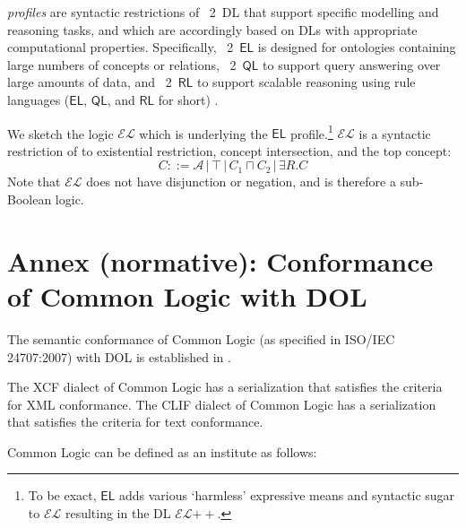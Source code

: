 \documentclass[10pt,%
\ifpretendfinal
final%
\else
draft%
\fi,
]{scrreprt}
\newcommand{\QL}{\ensuremath{\mathsf{QL}}\xspace}
\newcommand{\RL}{\ensuremath{\mathsf{RL}}\xspace}
\newcommand{\EL}{\ensuremath{\mathsf{EL}}\xspace}
\newcommand{\ELDL}{\ensuremath{\mathcal{EL}}\xspace}
\newcommand{\nisref}[1]{#1}
\newcommand{\normannex}[1]{ \chapter{Annex (normative): #1} }
\begin{document}
\begin{definition}
\OWL \emph{profiles} are syntactic restrictions of \OWL~2~DL that support specific modelling and reasoning tasks, %
and which are accordingly based on DLs with appropriate computational properties. Specifically, \OWL~2~\EL is designed for ontologies containing large numbers of concepts or relations, \OWL~2~\QL to support query answering over large amounts of data, and \OWL~2~\RL to support scalable reasoning using rule languages (\EL, \QL, and \RL for short) .
 
We sketch the logic \ELDL which is underlying the \EL profile.\footnote{To be exact, \EL adds various `harmless' expressive means and syntactic sugar to \ELDL resulting in the DL \ELDL$++$. %
} 
\ELDL is a syntactic restriction of \ALC to existential restriction, concept
intersection, and the top concept:
$$C ::= {\mathcal A} \,|\, \top \,|\,  C_1 \sqcap C_2 \,|\, \exists R . C$$
Note that \ELDL does not have disjunction or negation, and is therefore a sub-Boolean logic.
\end{definition}


\normannex{Conformance of Common Logic with DOL}\label{a:cl}

The semantic conformance of Common Logic (as specified in \nisref{ISO/IEC 24707:2007}) with DOL is established in \cite{OntoGraph}.

The XCF dialect of Common Logic has a serialization that satisfies the criteria for XML conformance.  The CLIF dialect of Common Logic has a serialization that satisfies the criteria for text conformance.

Common Logic can be defined as an institute as follows:
\end{document}
